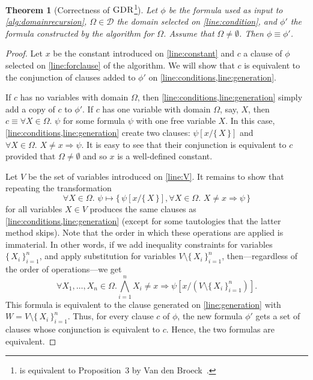\documentclass{article}
\newtheorem{theorem}{Theorem}
\theoremstyle{definition}
\DeclareMathOperator{\GDR}{\textsc{GDR}}
\begin{document}
\begin{theorem}[Correctness of $\GDR$\footnote{ is equivalent to
    Proposition~3 by Van den Broeck~.}]\label{thm:correctness1}
  Let $\phi$ be the formula used as input to \cref{alg:domainrecursion},
  $\Omega \in \mathcal{D}$ the domain selected on \cref{line:condition}, and
  $\phi'$ the formula constructed by the algorithm for $\Omega$. Assume that
  $\Omega \ne \emptyset$. Then $\phi \equiv \phi'$.
\end{theorem}
\begin{proof}
  Let $x$ be the constant introduced on \cref{line:constant} and $c$ a clause of
  $\phi$ selected on \cref{line:forclause} of the algorithm. We will show that
  $c$ is equivalent to the conjunction of clauses added to $\phi'$ on
  \cref{line:conditions,line:generation}.

  If $c$ has no variables with domain $\Omega$, then
  \cref{line:conditions,line:generation} simply add a copy of $c$ to $\phi'$. If
  $c$ has one variable with domain $\Omega$, say, $X$, then
  $c \equiv \forall X \in \Omega\text{. } \psi$ for some formula $\psi$ with one
  free variable $X$. In this case, \cref{line:conditions,line:generation} create
  two clauses: $\psi[x/\{\, X \,\}]$ and $\forall X \in \Omega\text{.
  } X \ne x \Rightarrow \psi$. It is easy to see that their conjunction is
  equivalent to $c$ provided that $\Omega \ne \emptyset$ and so $x$ is a
  well-defined constant.

  Let $V$ be the set of variables introduced on \cref{line:V}. It remains to
  show that repeating the transformation
  \[
    \forall X \in \Omega\text{. } \psi \mapsto \{\, \psi[x/\{\, X \,\}], \forall X \in \Omega\text{. } X \ne x \Rightarrow \psi \,\}
  \]
  for all variables $X \in V$ produces the same clauses as
  \cref{line:conditions,line:generation} (except for some tautologies that the
  latter method skips). Note that the order in which these operations are
  applied is immaterial. In other words, if we add inequality constraints for
  variables ${\{\, X_{i} \,\}}_{i=1}^{n}$, and apply substitution for variables
  $V \setminus {\{\, X_{i} \,\}}_{i=1}^{n}$, then---regardless of the order of
  operations---we get
  \[
    \forall X_{1}, \dots, X_{n} \in \Omega\text{.} \bigwedge_{i=1}^{n} X_{i} \ne x \Rightarrow \psi\left[x / \left(V \setminus {\{\, X_{i} \,\}}_{i=1}^{n}\right)\right].
  \]
  This formula is equivalent to the clause generated on \cref{line:generation}
  with $W = V \setminus {\{\, X_{i} \,\}}_{i=1}^{n}$. Thus, for every clause $c$
  of $\phi$, the new formula $\phi'$ gets a set of clauses whose conjunction is
  equivalent to $c$. Hence, the two formulas are equivalent.
\end{proof}
\end{document}

